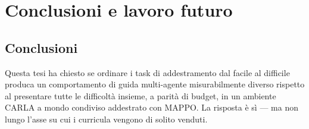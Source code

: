\chapter{Conclusioni e lavoro futuro}
\label{ch:conclusions}

\section{Conclusioni}
\label{sec:conclusions}

Questa tesi ha chiesto se ordinare i task di addestramento dal facile
al difficile produca un comportamento di guida multi-agente
misurabilmente diverso rispetto al presentare tutte le difficoltà
insieme, a parità di budget, in un ambiente CARLA a mondo condiviso
addestrato con MAPPO. La risposta è sì --- ma non lungo l'asse su cui i
curricula vengono di solito venduti.

